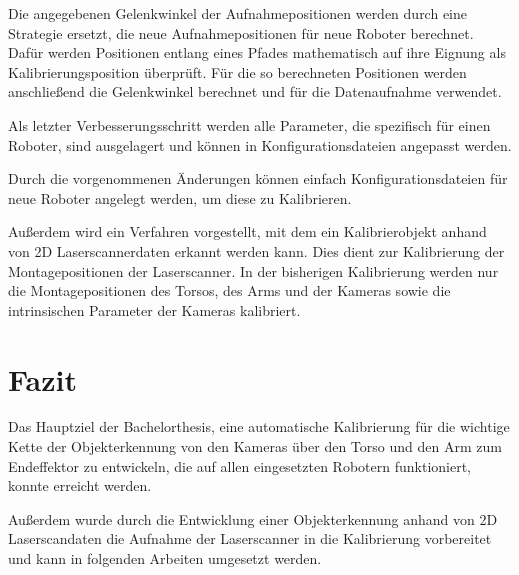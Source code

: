 \documentclass{scrartcl}
\begin{document}
Die angegebenen Gelenkwinkel der Aufnahmepositionen werden durch eine Strategie
ersetzt, die neue Aufnahmepositionen für neue Roboter berechnet. Dafür werden
Positionen entlang eines Pfades mathematisch auf ihre Eignung als
Kalibrierungsposition überprüft. Für die so berechneten Positionen werden 
anschließend die Gelenkwinkel berechnet und für die Datenaufnahme verwendet.

Als letzter Verbesserungsschritt werden alle Parameter, die spezifisch für einen
Roboter, sind ausgelagert und können in Konfigurationsdateien angepasst werden.

Durch die vorgenommenen Änderungen können einfach Konfigurationsdateien für neue
Roboter angelegt werden, um diese zu Kalibrieren.


Außerdem wird ein Verfahren vorgestellt, mit dem ein Kalibrierobjekt anhand
von 2D Laserscannerdaten erkannt werden kann. Dies dient zur Kalibrierung der
Montagepositionen der Laserscanner. In der bisherigen Kalibrierung werden nur
die Montagepositionen des Torsos, des Arms und der Kameras sowie die intrinsischen
Parameter der Kameras kalibriert.


\section{Fazit}

Das Hauptziel der Bachelorthesis, eine automatische Kalibrierung für die
wichtige Kette der Objekterkennung von den Kameras über den Torso und
den Arm zum Endeffektor zu entwickeln, die auf allen eingesetzten Robotern
funktioniert, konnte erreicht werden.

Außerdem wurde durch die Entwicklung einer Objekterkennung anhand von 2D 
Laserscandaten die Aufnahme der Laserscanner in die Kalibrierung vorbereitet
und kann in folgenden Arbeiten umgesetzt werden.
\end{document}
